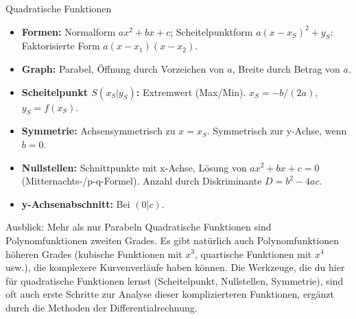 \begin{kurzknappumgebung}{Quadratische Funktionen}
\begin{itemize}
    \item \textbf{Formen:} Normalform $ax^2+bx+c$; Scheitelpunktform $a(x-x_S)^2+y_S$; Faktorisierte Form $a(x-x_1)(x-x_2)$.
    \item \textbf{Graph:} Parabel, Öffnung durch Vorzeichen von $a$, Breite durch Betrag von $a$.
    \item \textbf{Scheitelpunkt $S(x_S|y_S)$:} Extremwert (Max/Min). $x_S = -b/(2a)$, $y_S=f(x_S)$.
    \item \textbf{Symmetrie:} Achsensymmetrisch zu $x=x_S$. Symmetrisch zur y-Achse, wenn $b=0$.
    \item \textbf{Nullstellen:} Schnittpunkte mit x-Achse, Lösung von $ax^2+bx+c=0$ (Mitternachts-/p-q-Formel). Anzahl durch Diskriminante $D=b^2-4ac$.
    \item \textbf{y-Achsenabschnitt:} Bei $(0|c)$.
\end{itemize}
\end{kurzknappumgebung}

\begin{infoboxumgebung}{Ausblick: Mehr als nur Parabeln}
Quadratische Funktionen sind Polynomfunktionen zweiten Grades. Es gibt natürlich auch Polynomfunktionen höheren Grades (kubische Funktionen mit $x^3$, quartische Funktionen mit $x^4$ usw.), die komplexere Kurvenverläufe haben können. Die Werkzeuge, die du hier für quadratische Funktionen lernst (Scheitelpunkt, Nullstellen, Symmetrie), sind oft auch erste Schritte zur Analyse dieser komplizierteren Funktionen, ergänzt durch die Methoden der Differentialrechnung.
\end{infoboxumgebung}

